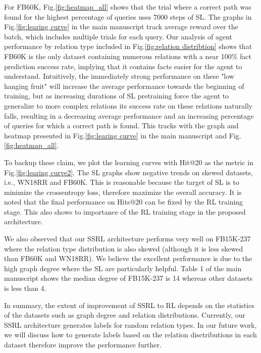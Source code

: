 \documentclass[letterpaper]{article} %
\begin{document}
For FB60K, Fig.\ref{fig:heatmap_all} shows that the trial where a correct path was found for the highest percentage of queries uses 7000 steps of SL. The graphs in Fig.\ref{fig:learing curve} in the main manuscript track average reward over the batch, which includes multiple trials for each query. Our analysis of agent performance by relation type included in Fig.\ref{fig:relation distribtion} shows that FB60K is the only dataset containing numerous relations with a near 100\% fact prediction success rate, implying that it contains facts easier for the agent to understand. Intuitively, the immediately strong performance on these "low hanging fruit" will increase the average performance towards the beginning of training, but as increasing durations of SL pretraining force the agent to generalize to more complex relations its success rate on these relations naturally falls, resulting in a decreasing average performance and an increasing percentage of queries for which a correct path is found. This tracks with the graph and heatmap presented in Fig.\ref{fig:learing curve} in the main manuscript and Fig.\ref{fig:heatmap_all}.

To backup these claim, we plot the learning curves with Hit@20 as the metric in Fig.\ref{fig:learing curve2}. The SL graphs show negative trends on skewed datasets, i.e., WN18RR and FB60K. This is reasonable because the target of SL is to minimize the crossentropy loss, therefore maximize the overall accuracy. It is noted that the final performance on Hits@20 can be fixed by the RL training stage. This also shows to importance of the RL training stage in the proposed architecture.

We also observed that our SSRL architecture performs very well on FB15K-237 where the relation type distribution is also skewed (although it is less skewed than FB60K and WN18RR). We believe the excellent performance is due to the high graph degree where the SL are particularly helpful. Table 1 of the main manuscript shows the median degree of FB15K-237 is 14 whereas other datasets is less than 4.

In summary, the extent of improvement of SSRL to RL depends on the statistics of the datasets such as graph degree and relation distributions. Currently, our SSRL architecture generates labels for random relation types. In our future work, we will discuss how to generate labels based on the relation disctributions in each dataset therefore improve the performance further.
\end{document}
